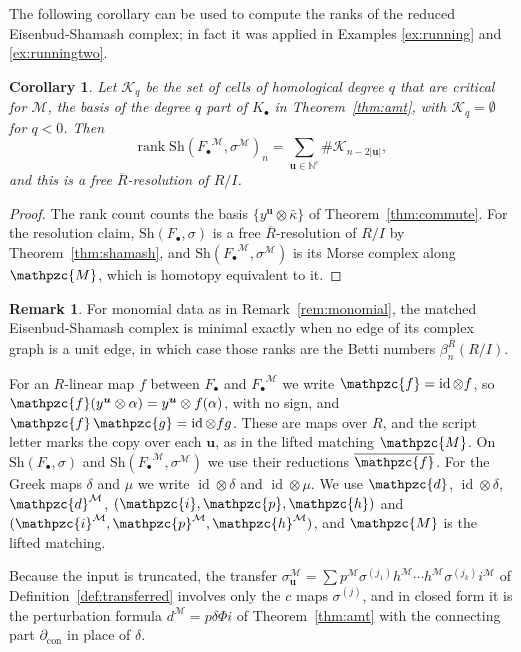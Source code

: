 \documentclass[12pt]{amsart}
\theoremstyle{plain}
\newtheorem{corollary}[theorem]{Corollary}
\theoremstyle{definition}
\newtheorem{remark}[theorem]{Remark}
\newcommand{\dcon}{\partial_{\mathrm{con}}}
\newcommand{\F}{ {F_\bullet} }
\newcommand{\Rbar}{\overline{R}}
\newcommand{\M}{\mathcal{M}}
\newcommand{\lift}[1]{\mathpzc{#1}}
\newcommand{\id}{\operatorname{id}}
\newcommand{\N}{\mathbb{N}}
\newcommand{\Sh}{\mathrm{Sh}}
\begin{document}
The following corollary can be used to compute the ranks of the reduced Eisenbud-Shamash complex; in fact it was applied in Examples \ref{ex:running} and \ref{ex:runningtwo}.

\begin{corollary}\label{cor:ranks}
Let $\mathcal{K}_q$ be the set of cells of homological degree $q$ that are critical for $\M$, the basis of the degree $q$ part of $K_\bullet$ in Theorem~\ref{thm:amt}, with $\mathcal{K}_q = \emptyset$ for $q < 0$. Then
    \[
        \operatorname{rank} \Sh(\F^{\M}, \sigma^{\M})_n = \sum_{\boldsymbol{u} \in \N^c} \#\mathcal{K}_{n - 2|\boldsymbol{u}|},
    \]
    and this is a free $\Rbar$-resolution of $R/I$.
\end{corollary}

\begin{proof}
    The rank count counts the basis $\{y^{\boldsymbol{u}} \otimes \bar\kappa\}$ of Theorem~\ref{thm:commute}. For the resolution claim, $\Sh(\F, \sigma)$ is a free $\Rbar$-resolution of $R/I$ by Theorem~\ref{thm:shamash}, and $\Sh(\F^{\M}, \sigma^{\M})$ is its Morse complex along $\lift{M}$, which is homotopy equivalent to it.
\end{proof}

\begin{remark} \label{rm:minCImatchedres}
    For monomial data as in Remark~\ref{rem:monomial}, the matched Eisenbud-Shamash complex is minimal exactly when no edge of its complex graph is a unit edge, in which case those ranks are the Betti numbers $\beta^{\Rbar}_n(R/I)$.
\end{remark}

For an $R$-linear map $f$ between $\F$ and $\F^{\M}$ we write $\lift{f} = \id \otimes f$, so $\lift{f}(y^{\boldsymbol{u}} \otimes \alpha) = y^{\boldsymbol{u}} \otimes f(\alpha)$, with no sign, and $\lift{f} \, \lift{g} = \id \otimes fg$. These are maps over $R$, and the script letter marks the copy over each $\boldsymbol{u}$, as in the lifted matching $\lift{M}$. On $\Sh(\F, \sigma)$ and $\Sh(\F^{\M}, \sigma^{\M})$ we use their reductions $\overline{\lift{f}}$. For the Greek maps $\delta$ and $\mu$ we write $\id \otimes \delta$ and $\id \otimes \mu$. We use $\lift{d}$, $\id \otimes \delta$, $\lift{d}^{\M}$, $(\lift{i}, \lift{p}, \lift{h})$ and $(\lift{i}^{\M}, \lift{p}^{\M}, \lift{h}^{\M})$, and $\lift{M}$ is the lifted matching.

Because the input is truncated, the transfer $\sigma^{\M}_{\boldsymbol{u}} = \sum p^{\M} \sigma^{(j_1)} h^{\M} \cdots h^{\M} \sigma^{(j_k)} i^{\M}$ of Definition~\ref{def:transferred} involves only the $c$ maps $\sigma^{(j)}$, and in closed form it is the perturbation formula $d^{\M} = p \delta \Phi i$ of Theorem~\ref{thm:amt} with the connecting part $\dcon$ in place of $\delta$.
\end{document}
